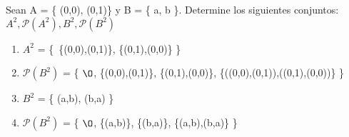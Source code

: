 \section{}
Sean A = \{ (0,0), (0,1)\} y B = \{ a, b \}. Determine los siguientes conjuntos: $A^{2}, \mathcal{P}(A^{2}), B^{2}, \mathcal{P}(B^{2})$

\begin{enumerate}
\item $A^{2}$ = \{\ \{(0,0),(0,1)\}, \{(0,1),(0,0)\} \}
\item $\mathcal{P}(B^{2})$ = \{ $\O$, \{(0,0),(0,1)\}, \{(0,1),(0,0)\}, \{((0,0),(0,1)),((0,1),(0,0))\} \}
\item $B^{2}$ = \{ (a,b), (b,a) \}
\item $\mathcal{P}(B^{2})$ = \{ $\O$, \{(a,b)\}, \{(b,a)\}, \{(a,b),(b,a)\} \}
\end{enumerate}
